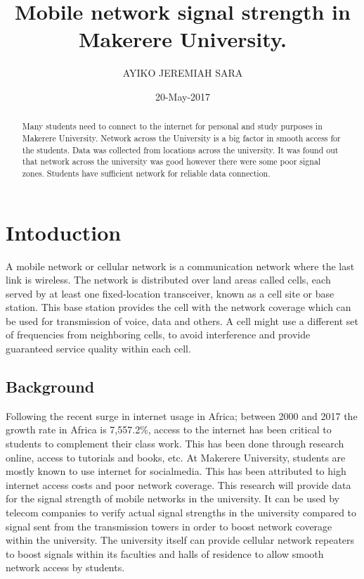 \documentclass{article}
\begin{document}
\title{Mobile network signal strength in Makerere University.}
\date{20-May-2017}

\author{AYIKO JEREMIAH SARA}


\maketitle
\newpage

\begin{abstract}
Many students need to connect to the internet for personal and study purposes in Makerere University. Network across the University is a big factor in smooth access for the students. Data was collected from locations across the university. It was found out that network across the university was good however there were some poor signal zones. Students have sufficient network for reliable data connection.
\end{abstract}

\newpage

\tableofcontents
\newpage

\section{Intoduction}
A mobile network or cellular network is a communication network where the last link is wireless. The network is distributed over land areas called cells, each served by at least one fixed-location transceiver, known as a cell site or base station. This base station provides the cell with the network coverage which can be used for transmission of voice, data and others. A cell might use a different set of frequencies from neighboring cells, to avoid interference and provide guaranteed service quality within each cell.\cite{key:1}

\subsection{Background}
Following the recent surge in internet usage in Africa; between 2000 and 2017 the growth rate in Africa is 7,557.2\%\cite{key:2}, access to the internet has been critical to students to complement their class work. This has been done through research online, access to tutorials and books, etc. At Makerere University, students are mostly known to use internet for socialmedia. This has been attributed to high internet access costs and poor network coverage. This research will provide data for the signal strength of mobile networks in the university. It can be used by telecom companies to verify actual signal strengths in the university compared to signal sent from the transmission towers in order to boost network coverage within the university. The university itself can provide cellular network repeaters to boost signals within its faculties and halls of residence to allow smooth network access by students.
\end{document}
